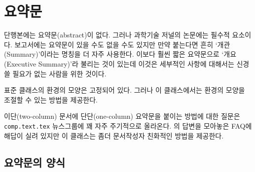 \chapter{요약문}

단행본에는 요약문(abstract)이 없다. 그러나 과학기술 저널의 논문에는 필수적 요소이다. 보고서에는 요약문이 있을 수도 없을 수도 있지만 만약 붙는다면
흔히 ‘개관(Summary)’이라는 명칭을 더 자주 사용한다. 이보다 훨씬 짧은 요약문으로 ‘개요(Executive Summary)’라 불리는 것이 있는데 이것은 세부적인 사항에
대해서는 신경쓸 필요가 없는 사람을 위한 것이다.

표준 클래스의  환경의 모양은 고정되어 있다. 그러나 이 클래스에서는
 환경의 모양을 조절할 수 있는 방법을 제공한다.

이단(two-column) 문서에
단단(one-column) 요약문을 붙이는 방법에
대한 질문은 \texttt{comp.text.tex} 뉴스그룹에 꽤 자주 주기적으로 올라온다.
\ctt 의 답변을 모아놓은 FAQ에 해답이 실려 있지만 이 클래스는 좀더 문서작성자 친화적인
방법을 제공한다.

\section{요약문의 양식}

